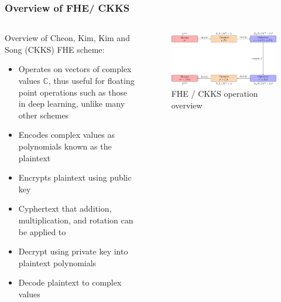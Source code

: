 \documentclass[aspectratio=169]{beamer}
\begin{document}
  \begin{frame}
    \frametitle{Overview of FHE/ CKKS}
    \begin{columns}
      \begin{column}{0.5\textwidth}
        Overview of Cheon, Kim, Kim and Song (CKKS) \autocite{cheon2017homomorphic, cheon2018bootstrapping} FHE scheme:
        \begin{itemize}
          \item Operates on vectors of complex values $\mathbb{C}$, thus useful for floating point operations such as those in deep learning, unlike many other schemes
          \item Encodes complex values as polynomials known as the plaintext
          \item Encrypts plaintext using public key
          \item Cyphertext that addition, multiplication, and rotation can be applied to
          \item Decrypt using private key into plaintext polynomials
          \item Decode plaintext to complex values
        \end{itemize}
      \end{column}
      \begin{column}{0.5\textwidth}
        \begin{figure}[th!]
          \centering
          \includegraphics[width=1\textwidth]{fhe-overview.pdf}
          \caption{FHE / CKKS operation overview \autocite{openmined}}
          \label{fig:jim_carrey}
        \end{figure}
      \end{column}
    \end{columns}
  \end{frame}
\end{document}
